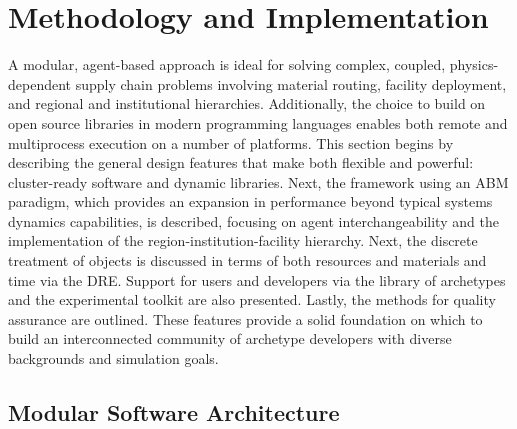 \section{Methodology and Implementation}

A modular, agent-based approach is ideal for solving complex, coupled,
physics-dependent supply chain problems involving material routing, facility
deployment, and regional and institutional hierarchies. Additionally, the choice to 
build \Cyclus on open source libraries in modern programming languages enables 
both remote and multiprocess execution on a number of platforms. This section begins by 
describing the general design features that make \Cyclus both flexible and powerful:
cluster-ready software and dynamic libraries.  Next, the framework using an
\gls{ABM} paradigm, which provides an expansion in performance beyond typical systems dynamics
capabilities, is described, focusing on agent interchangeability and the 
implementation of the region-institution-facility hierarchy. 
Next, the discrete treatment of objects is discussed in terms of both
resources and materials and time via the \gls{DRE}.
Support for users and developers via the \Cycamore library of
archetypes and the experimental toolkit are also presented.
Lastly, the methods for quality assurance are outlined.
These features provide a solid foundation on which to build an interconnected community 
of archetype developers with diverse backgrounds and simulation goals.

\subsection{Modular Software Architecture}

